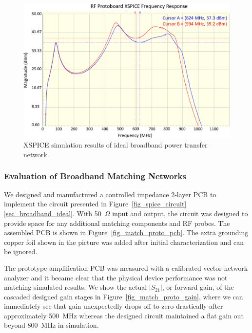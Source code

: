 \begin{figure}[p]
\centering
  \includegraphics[width=0.9\linewidth]{figs/matching/RF_Protoboard_XSPICE}   
    \caption{XSPICE simulation results of ideal broadband power transfer network.}
\label{fig_spice_results}
\end{figure} 
	
\subsubsection{Evaluation of Broadband Matching Networks}
\label{sec_rf_protoboard}
	
	We designed and manufactured a controlled impedance 2-layer PCB to implement the circuit presented in Figure~\ref{fig_spice_circuit} \ref{sec_broadband_ideal}.
	With 50~$\Omega$ input and output, the circuit was designed to provide space for any additional matching components and RF probes.
	The assembled PCB is shown in Figure~\ref{fig_match_proto_pcb}.
	The extra grounding copper foil shown in the picture was added after initial characterization and can be ignored.
	
	The prototype amplification PCB was measured with a calibrated vector network analyzer and it became clear that the physical device performance was not matching simulated results.
	We show the actual $|S_{21}|$, or forward gain, of the cascaded designed gain stages in Figure~\ref{fig_match_proto_gain}, where we can immediately see that gain unexpectedly drops off to zero drastically after approximately 500~MHz whereas the designed circuit maintained a flat gain out beyond 800~MHz in simulation.


